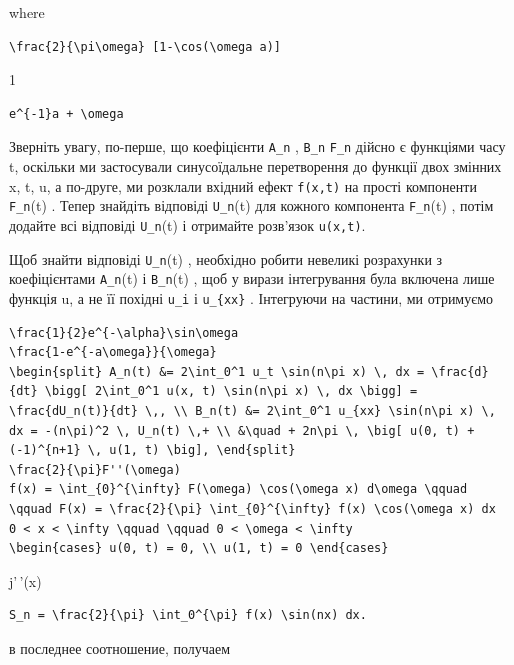 \documentclass[
  ukrainian,
]{article}
\begin{document}
where

\begin{verbatim}
\frac{2}{\pi\omega} [1-\cos(\omega a)]
\end{verbatim}

1

\begin{verbatim}
e^{-1}a + \omega
\end{verbatim}

Зверніть увагу, по-перше, що коефіцієнти \texttt{A\_n} , \texttt{B\_n}
\texttt{F\_n} дійсно є функціями часу t, оскільки ми застосували
синусоїдальне перетворення до функції двох змінних x, t, u, а по-друге,
ми розклали вхідний ефект \texttt{f(x,t)} на прості компоненти
\texttt{F\_n}(t) . Тепер знайдіть відповіді \texttt{U\_n}(t) для кожного
компонента \texttt{F\_n}(t) , потім додайте всі відповіді
\texttt{U\_n}(t) і отримайте розв'язок \texttt{u(x,t)}.

Щоб знайти відповіді \texttt{U\_n}(t) , необхідно робити невеликі
розрахунки з коефіцієнтами \texttt{A\_n}(t) і \texttt{B\_n}(t) , щоб у
вирази інтегрування була включена лише функція u, а не її похідні
\texttt{u\_i} і \texttt{u\_\{xx\}} . Інтегруючи на частини, ми отримуємо

\begin{verbatim}
\frac{1}{2}e^{-\alpha}\sin\omega
\frac{1-e^{-a\omega}}{\omega}
\begin{split} A_n(t) &= 2\int_0^1 u_t \sin(n\pi x) \, dx = \frac{d}{dt} \bigg[ 2\int_0^1 u(x, t) \sin(n\pi x) \, dx \bigg] = \frac{dU_n(t)}{dt} \,, \\ B_n(t) &= 2\int_0^1 u_{xx} \sin(n\pi x) \, dx = -(n\pi)^2 \, U_n(t) \,+ \\ &\quad + 2n\pi \, \big[ u(0, t) + (-1)^{n+1} \, u(1, t) \big], \end{split}
\frac{2}{\pi}F''(\omega)
f(x) = \int_{0}^{\infty} F(\omega) \cos(\omega x) d\omega \qquad \qquad F(x) = \frac{2}{\pi} \int_{0}^{\infty} f(x) \cos(\omega x) dx
0 < x < \infty \qquad \qquad 0 < \omega < \infty
\begin{cases} u(0, t) = 0, \\ u(1, t) = 0 \end{cases}
\end{verbatim}

j'\,'(x)

\begin{verbatim}
S_n = \frac{2}{\pi} \int_0^{\pi} f(x) \sin(nx) dx.
\end{verbatim}

в последнее соотношение, получаем
\end{document}

